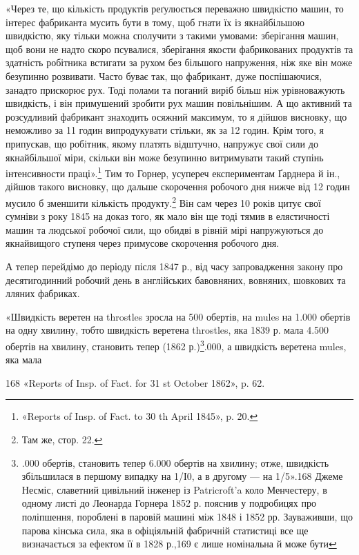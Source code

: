 «Через те, що кількість продуктів реґулюється переважно
швидкістю машин, то інтерес фабриканта мусить бути в тому,
щоб гнати їх із якнайбільшою швидкістю, яку тільки можна
сполучити з такими умовами: зберігання машин, щоб вони не
надто скоро псувалися, зберігання якости фабрикованих продуктів
та здатність робітника встигати за рухом без більшого напруження,
ніж яке він може безупинно розвивати. Часто буває так,
що фабрикант, дуже поспішаючися, занадто прискорює рух.
Тоді полами та поганий виріб більш ніж урівноважують швидкість,
і він примушений зробити рух машин повільнішим. А що
активний та розсудливий фабрикант знаходить осяжний максимум,
то я дійшов висновку, що неможливо за 11 годин випродукувати
стільки, як за 12 годин. Крім того, я припускав, що робітник,
якому платять відштучно, напружує свої сили до якнайбільшої
міри, скільки він може безупинно витримувати такий
ступінь інтенсивности праці».\footnote{
«Reports of Insp. of Fact. to 30 th April 1845», p. 20.
} Тим то Горнер, усупереч експериментам
Ґарднера й ін., дійшов такого висновку, що дальше скорочення
робочого дня нижче від 12 годин мусило б зменшити
кількість продукту.\footnote{
Там же, стор. 22.
} Він сам через 10 років цитує свої сумніви
з року 1845 на доказ того, як мало він ще тоді тямив в елястичності
машин та людської робочої сили, що обидві в рівній мірі
напружуються до якнайвищого ступеня через примусове скорочення
робочого дня.

А тепер перейдімо до періоду після 1847 р., від часу запровадження
закону про десятигодинний робочий день в англійських
бавовняних, вовняних, шовкових та лляних фабриках.

«Швидкість веретен на throstles зросла на 500 обертів, на
mules на 1.000 обертів на одну хвилину, тобто швидкість веретена
throstles, яка 1839 р. мала 4.500 обертів на хвилину, становить
тепер (1862 р.)\footnote{
.000 обертів, становить тепер 6.000 обертів на хвилину; отже,
швидкість збільшилася в першому випадку на 1/І0, а в другому —
на 1/5».168 Джеме Несміс, славетний цивільний інженер із
Patricroft’a коло Менчестеру, в одному листі до Леонарда Горнера
1852 р. пояснив у подробицях про поліпшення, пороблені в паровій
машині між 1848 і 1852 рр. Зауваживши, що парова кінська
сила, яка в офіціяльній фабричній статистиці все ще визначається
за ефектом її в 1828 р.,169 є лише номінальна й може бути
}.000, а швидкість веретена mules, яка мала

168 «Reports of Insp. of Fact. for 31 st October 1862», p. 62.

